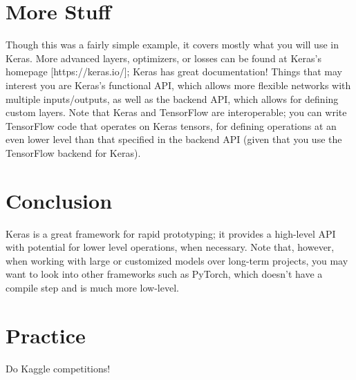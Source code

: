\documentclass{article}
\begin{document}
\section{More Stuff}
    Though this was a fairly simple example, it covers mostly what you will use in Keras. More advanced layers, optimizers, or losses can be found at Keras's homepage [https://keras.io/]; Keras has great documentation! Things that may interest you are Keras's functional API, which allows more flexible networks with multiple inputs/outputs, as well as the backend API, which allows for defining custom layers. 
    Note that Keras and TensorFlow are interoperable; you can write TensorFlow code that operates on Keras tensors, for defining operations at an even lower level than that specified in the backend API (given that you use the TensorFlow backend for Keras).
    
\section{Conclusion}
    Keras is a great framework for rapid prototyping; it provides a high-level API with potential for lower level operations, when necessary. Note that, however, when working with large or customized models over long-term projects, you may want to look into other frameworks such as PyTorch, which doesn't have a compile step and is much more low-level.
\section{Practice}
    Do Kaggle competitions!
\end{document}

